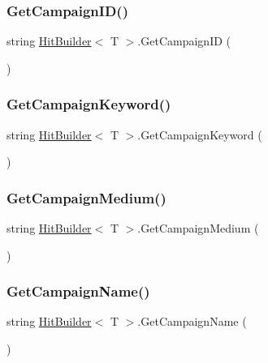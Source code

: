 \subsubsection{\texorpdfstring{Get\+Campaign\+I\+D()}{GetCampaignID()}}
{\footnotesize\ttfamily string \hyperlink{class_hit_builder}{Hit\+Builder}$<$ T $>$.Get\+Campaign\+ID (\begin{DoxyParamCaption}{ }\end{DoxyParamCaption})}

\mbox{\label{class_hit_builder_a9203f40c77a69afbe914b0d0bab731f1}} 
\subsubsection{\texorpdfstring{Get\+Campaign\+Keyword()}{GetCampaignKeyword()}}
{\footnotesize\ttfamily string \hyperlink{class_hit_builder}{Hit\+Builder}$<$ T $>$.Get\+Campaign\+Keyword (\begin{DoxyParamCaption}{ }\end{DoxyParamCaption})}

\mbox{\label{class_hit_builder_aca044ca6b6f99a4d871344bbcded1b4c}} 
\subsubsection{\texorpdfstring{Get\+Campaign\+Medium()}{GetCampaignMedium()}}
{\footnotesize\ttfamily string \hyperlink{class_hit_builder}{Hit\+Builder}$<$ T $>$.Get\+Campaign\+Medium (\begin{DoxyParamCaption}{ }\end{DoxyParamCaption})}

\mbox{\label{class_hit_builder_a610c6edc4b4597a15c4ff40d13d18c2c}} 
\subsubsection{\texorpdfstring{Get\+Campaign\+Name()}{GetCampaignName()}}
{\footnotesize\ttfamily string \hyperlink{class_hit_builder}{Hit\+Builder}$<$ T $>$.Get\+Campaign\+Name (\begin{DoxyParamCaption}{ }\end{DoxyParamCaption})}

